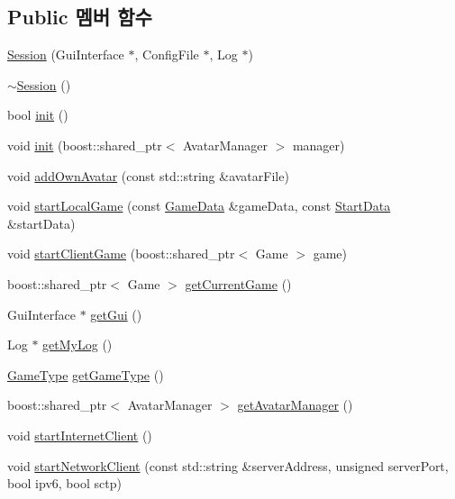 \subsection*{Public 멤버 함수}
\begin{DoxyCompactItemize}
\item 
\hyperlink{class_session_a7bc6792892226050a8cf19d5e9c17541}{Session} (Gui\-Interface $\ast$, Config\-File $\ast$, Log $\ast$)
\item 
\hyperlink{class_session_a8753bb9dee966b7d39abc9b7237cd665}{$\sim$\-Session} ()
\item 
bool \hyperlink{class_session_a94dcf560238662a4e2626a654df008f3}{init} ()
\item 
void \hyperlink{class_session_acb341298736898e0c913aa2e17c819e8}{init} (boost\-::shared\-\_\-ptr$<$ Avatar\-Manager $>$ manager)
\item 
void \hyperlink{class_session_acc80127497f991a082269c2e6b6cddb9}{add\-Own\-Avatar} (const std\-::string \&avatar\-File)
\item 
void \hyperlink{class_session_af2e661d4bcda30cfda7c90547ce2260a}{start\-Local\-Game} (const \hyperlink{struct_game_data}{Game\-Data} \&game\-Data, const \hyperlink{struct_start_data}{Start\-Data} \&start\-Data)
\item 
void \hyperlink{class_session_ae7f595ddf3e73d0d923e9ccd3b77cb56}{start\-Client\-Game} (boost\-::shared\-\_\-ptr$<$ Game $>$ game)
\item 
boost\-::shared\-\_\-ptr$<$ Game $>$ \hyperlink{class_session_a4105c943da66294d2296e31bc34d5ff9}{get\-Current\-Game} ()
\item 
Gui\-Interface $\ast$ \hyperlink{class_session_ab1f394edd6080e4303bd292b0f842ce1}{get\-Gui} ()
\item 
Log $\ast$ \hyperlink{class_session_a8b3eeaaa1732a6a403bf799b8feab70d}{get\-My\-Log} ()
\item 
\hyperlink{class_session_a6989c72d21ad19fd7abbd1c8d95d78c1}{Game\-Type} \hyperlink{class_session_a5e07b844e121855419719abcbd8aa61a}{get\-Game\-Type} ()
\item 
boost\-::shared\-\_\-ptr$<$ Avatar\-Manager $>$ \hyperlink{class_session_a96a5366d8d4455494ca27ed412cb37a5}{get\-Avatar\-Manager} ()
\item 
void \hyperlink{class_session_a2e89781eb6911f3d7a40b475bc83c8c8}{start\-Internet\-Client} ()
\item 
void \hyperlink{class_session_aab2276257cc5c64e11a05784daf414e5}{start\-Network\-Client} (const std\-::string \&server\-Address, unsigned server\-Port, bool ipv6, bool sctp)

\end{DoxyCompactItemize}
